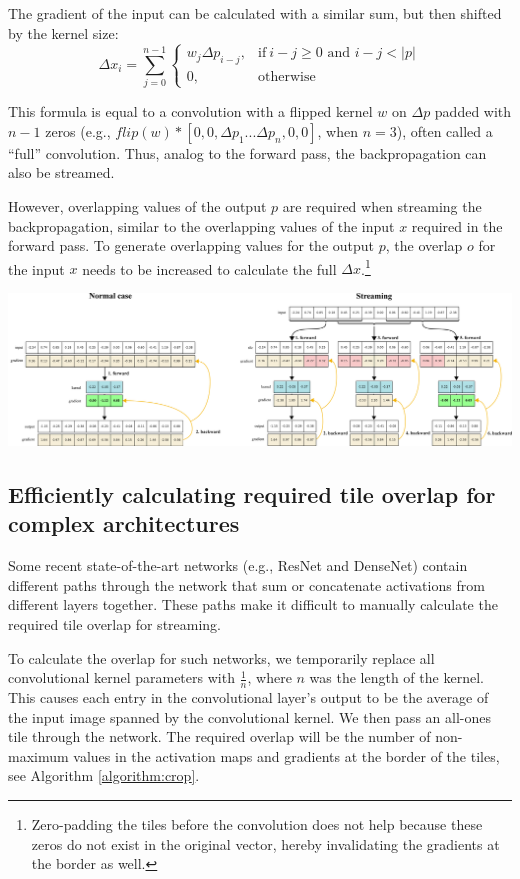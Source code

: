 \documentclass[
  12pt,
  a5,margin=2cmpaper,
]{article}
\begin{document}
The gradient of the input can be calculated with a similar sum, but then
shifted by the kernel size: \[%
\Delta x_i = \sum_{j=0}^{n-1} 
\begin{cases}
  w_j\Delta p_{i-j}, & \text{if}\ i-j \geq 0 \text{ and } i - j < \lvert p \rvert  \\
  0, & \text{otherwise}
\end{cases}
\]

This formula is equal to a convolution with a flipped kernel \(w\) on
\(\Delta p\) padded with \(n - 1\) zeros (e.g.,
\(flip(w) * [0, 0, \Delta p_1 ... \Delta p_n, 0, 0]\), when \(n=3\)),
often called a ``full'' convolution. Thus, analog to the forward pass,
the backpropagation can also be streamed.

However, overlapping values of the output \(p\) are required when
streaming the backpropagation, similar to the overlapping values of the
input \(x\) required in the forward pass. To generate overlapping values
for the output \(p\), the overlap \(o\) for the input \(x\) needs to be
increased to calculate the full \(\Delta x\).\footnote{Zero-padding the
  tiles before the convolution does not help because these zeros do not
  exist in the original vector, hereby invalidating the gradients at the
  border as well.}

\includegraphics{chpt2_imgs/1dexample.png}

\hypertarget{calculateoverlap}{%
\subsection{Efficiently calculating required tile overlap for complex
architectures}\label{calculateoverlap}}

Some recent state-of-the-art networks (e.g., ResNet and DenseNet)
contain different paths through the network that sum or concatenate
activations from different layers together. These paths make it
difficult to manually calculate the required tile overlap for streaming.

To calculate the overlap for such networks, we temporarily replace all
convolutional kernel parameters with \(\frac{1}{n}\), where \(n\) was
the length of the kernel. This causes each entry in the convolutional
layer's output to be the average of the input image spanned by the
convolutional kernel. We then pass an all-ones tile through the network.
The required overlap will be the number of non-maximum values in the
activation maps and gradients at the border of the tiles, see Algorithm
\protect\hyperlink{algorithm:crop}{{[}algorithm:crop{]}}.
\end{document}
